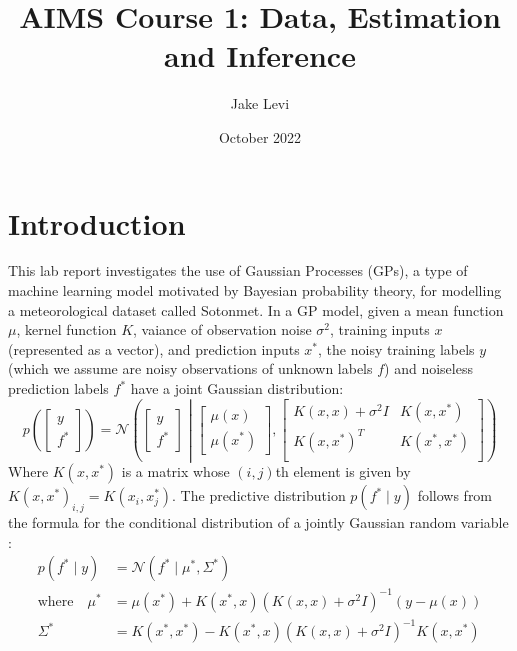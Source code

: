\documentclass{article}
\title{AIMS Course 1: Data, Estimation and Inference}
\author{Jake Levi}
\date{October 2022}
\begin{document}
\maketitle
\section{Introduction} \label{section:intro}
This lab report investigates the use of Gaussian Processes (GPs), a type of machine learning model motivated by Bayesian probability theory, for modelling a meteorological dataset called Sotonmet. In a GP model, given a mean function $\mu$, kernel function $K$, vaiance of observation noise $\sigma^2$, training inputs $x$ (represented as a vector), and prediction inputs $x^*$, the noisy training labels $y$ (which we assume are noisy observations of unknown labels $f$) and noiseless prediction labels $f^*$ have a joint Gaussian distribution:
\begin{equation}
    p\left( \begin{bmatrix}
        y \\
        f^*
    \end{bmatrix} \right)
    = \mathcal{N} \left( \begin{bmatrix}
        y \\
        f^*
    \end{bmatrix} \middle| \begin{bmatrix}
        \mu(x) \\
        \mu(x^*)
    \end{bmatrix}, \begin{bmatrix}
        K(x, x) + \sigma^2 I & K(x, x^*) \\
        K(x, x^*)^T & K(x^*, x^*) \\
    \end{bmatrix} \right)
\end{equation}
Where $K(x, x^*)$ is a matrix whose $(i, j)$th element is given by $K(x, x^*)_{i,j} = K(x_i, x^*_j)$. The predictive distribution $p(f^* \mid y)$ follows from the formula for the conditional distribution of a jointly Gaussian random variable \cite{bishop2006pattern}:
\begin{align}
    p(f^* \mid y) &= \mathcal{N}\left(f^* \mid \mu^*, \Sigma^* \right) \label{eq:conditional distribution} \\
    \text{where} \quad \mu^* &= \mu(x^*) + K(x^*, x) \left( K(x, x) + \sigma^2 I \right)^{-1} (y - \mu(x)) \label{eq:conditional mean} \\
    \Sigma^* &= K(x^*, x^*) - K(x^*, x) \left( K(x, x) + \sigma^2 I \right) ^{-1} K(x, x^*) \label{eq:conditional variance}
\end{align}
\end{document}
